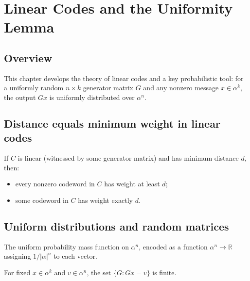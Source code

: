 \chapter{Linear Codes and the Uniformity Lemma}
\section{Overview}

This chapter develops the theory of linear codes and a key probabilistic tool:
for a uniformly random $n\times k$ generator matrix $G$ and any nonzero message
$x\in\alpha^k$, the output $Gx$ is uniformly distributed over $\alpha^n$.

\section{Distance equals minimum weight in linear codes}

\begin{theorem}
\leanok
{}
If $C$ is linear (witnessed by some generator matrix) and has minimum distance $d$, then:
\begin{itemize}
  \item every nonzero codeword in $C$ has weight at least $d$;
  \item some codeword in $C$ has weight exactly $d$.
\end{itemize}
\end{theorem}

\section{Uniform distributions and random matrices}

\begin{definition}
\leanok
The uniform probability mass function on $\alpha^n$, encoded as a function
$\alpha^n\to\mathbb{R}$ assigning $1/|\alpha|^n$ to each vector.
\end{definition}

\begin{lemma}
\leanok
For fixed $x\in\alpha^k$ and $v\in\alpha^n$, the set $\{G : Gx=v\}$ is finite.
\end{lemma}

